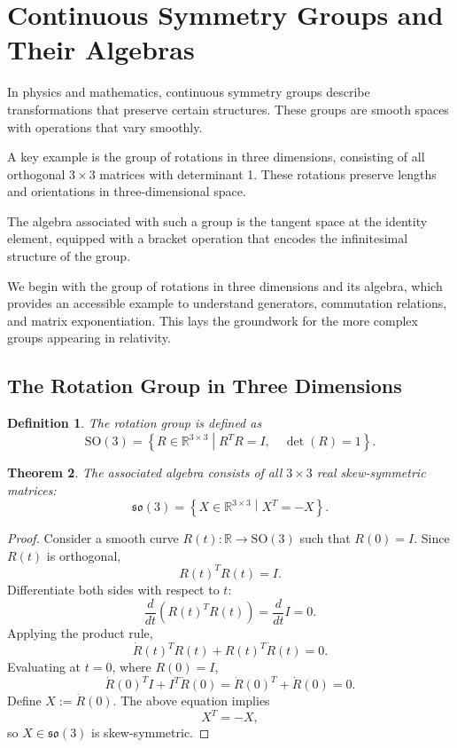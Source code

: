 \documentclass{amsart}
\newtheorem{theorem}{Theorem}[section]
\newtheorem{definition}[theorem]{Definition}
\theoremstyle{remark}
\begin{document}
\section{Continuous Symmetry Groups and Their Algebras}
\label{sec:groups}

In physics and mathematics, continuous symmetry groups describe transformations that preserve certain structures. These groups are smooth spaces with operations that vary smoothly.

A key example is the group of rotations in three dimensions, consisting of all orthogonal \(3 \times 3\) matrices with determinant 1. These rotations preserve lengths and orientations in three-dimensional space.

The algebra associated with such a group is the tangent space at the identity element, equipped with a bracket operation that encodes the infinitesimal structure of the group.

We begin with the group of rotations in three dimensions and its algebra, which provides an accessible example to understand generators, commutation relations, and matrix exponentiation. This lays the groundwork for the more complex groups appearing in relativity.

\subsection{The Rotation Group in Three Dimensions}

\begin{definition}
  The rotation group is defined as
  \[
  \mathrm{SO}(3) = \left\{ R \in \mathbb{R}^{3 \times 3} \middle| R^T R = I, \quad \det(R) = 1 \right\}.
  \]
\end{definition}

\begin{theorem}
  The associated algebra consists of all \(3 \times 3\) real skew-symmetric matrices:
  \[
  \mathfrak{so}(3) = \left\{ X \in \mathbb{R}^{3 \times 3} \middle| X^T = -X \right\}.
  \]
\end{theorem}

\begin{proof}
  Consider a smooth curve \(R(t): \mathbb{R} \to \mathrm{SO}(3)\) such that \(R(0) = I\).
  Since \(R(t)\) is orthogonal,
  \[
  R(t)^T R(t) = I.
  \]
  Differentiate both sides with respect to \(t\):
  \[
  \frac{d}{dt} \left( R(t)^T R(t) \right) = \frac{d}{dt} I = 0.
  \]
  Applying the product rule,
  \[
  \dot{R}(t)^T R(t) + R(t)^T \dot{R}(t) = 0.
  \]
  Evaluating at \(t=0\), where \(R(0) = I\),
  \[
  \dot{R}(0)^T I + I^T \dot{R}(0) = \dot{R}(0)^T + \dot{R}(0) = 0.
  \]
  Define \(X := \dot{R}(0)\). The above equation implies
  \[
  X^T = -X,
  \]
  so \(X \in \mathfrak{so}(3)\) is skew-symmetric.
\end{proof}
\end{document}
